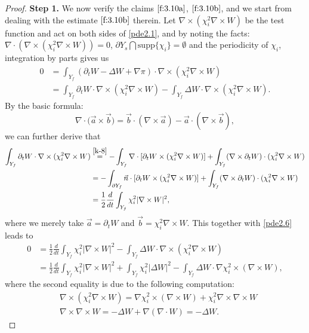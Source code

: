 \documentclass[13pt,CJK]{article}
\theoremstyle{plain}                       %
\theoremstyle{remark}
\numberwithin{equation}{section}
\begin{document}
\begin{proof}
\textbf{Step 1.}
We now verify the claims $\eqref{f:3.10a}$, $\eqref{f:3.10b}$,
and we start from dealing with the estimate $\eqref{f:3.10b}$ therein.
Let $\nabla\times(\chi^2_i\nabla\times W)$ be the test function and act on both sides of \eqref{pde2.1}, and by noting the facts:  $\nabla\cdot(\nabla\times (\chi_i^2\nabla\times W))=0$, $\partial Y_s\bigcap\text{supp}\{\chi_i\}=\emptyset$ and the periodicity of $\chi_i$,
integration by parts gives us
\begin{equation}\label{pde2.6}
\begin{aligned}
0&=\int_{Y_f}(\partial_t W-\Delta W+\nabla\pi)
\cdot\nabla\times(\chi_i^2\nabla\times W)\\
&=\int_{Y_f}\partial_t W
\cdot\nabla\times(\chi_i^2\nabla\times W)-
\int_{Y_f}\Delta W\cdot\nabla\times(\chi_i^2\nabla\times W).
\end{aligned}
\end{equation}
By the basic formula:
\begin{equation}\label{k-8}
 \nabla\cdot\big(\vec{a}\times \vec{b}\big) =\vec{b}\cdot(\nabla\times \vec{a})
 -\vec{a}\cdot(\nabla\times \vec{b}),
\end{equation}
we can further derive that
\begin{equation*}
\begin{aligned}
\int_{Y_f}\partial_t W
\cdot\nabla\times(\chi_i^2\nabla\times W)
&\overset{\eqref{k-8}}{=}-\int_{Y_f}\nabla\cdot[\partial_t W\times(\chi_i^2\nabla\times W)]
+\int_{Y_f}(\nabla\times\partial_t W)\cdot
(\chi_i^2\nabla\times W) \\
&=-\int_{\partial Y_f}\vec{n}\cdot[\partial_t W\times(\chi_i^2\nabla\times W)]
+\int_{Y_f}(\nabla\times\partial_t W)\cdot
(\chi_i^2\nabla\times W) \\
&=\frac{1}{2}\frac{d}{dt}\int_{Y_f}
\chi_i^2|\nabla\times W|^2,
\end{aligned}
\end{equation*}
where we merely take 
$\vec{a}=\partial_t W$ and $\vec{b}= \chi_i^2\nabla\times W$. This together with \eqref{pde2.6} leads to
\begin{equation}\label{k-7}
\begin{aligned}
0&=\frac{1}{2}\frac{d}{dt}\int_{Y_f}
\chi_i^2|\nabla\times W|^2
-\int_{Y_f}\Delta W\cdot\nabla\times(\chi_i^2\nabla\times W)\\
&=\frac{1}{2}\frac{d}{dt}\int_{Y_f}
\chi_i^2|\nabla\times W|^2+\int_{Y_f}\chi_i^2|\Delta W|^2-
\int_{Y_f}\Delta W\cdot\nabla\chi_i^2\times(\nabla\times W),
\end{aligned}
\end{equation}
where the second equality is due to the following computation:
\begin{equation*}
\begin{aligned}
&\nabla\times (\chi_i^2\nabla\times W)=\nabla\chi^2_i\times(\nabla\times W)+\chi_i^2\nabla\times\nabla\times W\\
&\nabla\times\nabla\times W=-\Delta W+\nabla(\nabla\cdot W)=-\Delta W.
\end{aligned}
\end{equation*}


\end{proof}
\end{document}
